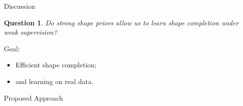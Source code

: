 \documentclass[22pt,table]{beamer}
\newtheorem{question}{Question}
\begin{document}
  \begin{frame}
    {\large Discussion}
    
    \begin{question}
      Do strong shape priors allow us to learn shape completion under weak supervision?
    \end{question}
    
    Goal:
    \begin{itemize}
      \item Efficient shape completion;
      \item and learning on real data.
    \end{itemize}
  \end{frame}
  
  \begin{frame}
    \begin{center}
      {\Large Proposed Approach}
    \end{center}
  \end{frame}
  
\end{document}
